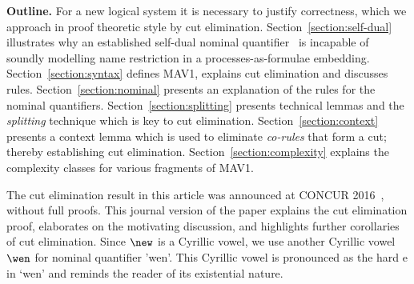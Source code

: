 \documentclass[UKenglish,acmsmall,authorversion]{acmart}
\theoremstyle{plain}
\begin{document}
\textbf{Outline.}
For a new logical system it is necessary to justify correctness, which we approach in proof theoretic style by cut elimination.
Section~\ref{section:self-dual} illustrates why an established self-dual nominal quantifier~\cite{Gabbay2002,Pitts2003,Tiu2009,Gacek2011} is incapable of soundly modelling name restriction in a processes-as-formulae embedding.
Section~\ref{section:syntax} defines \textsf{MAV1}, explains cut elimination and discusses rules.
Section~\ref{section:nominal} presents an explanation of the rules for the nominal quantifiers.
Section~\ref{section:splitting} presents technical lemmas and the \textit{splitting} technique which is key to cut elimination.
Section~\ref{section:context} presents a context lemma which is used to eliminate \textit{co-rules} that form a cut; thereby establishing cut elimination.
Section~\ref{section:complexity} explains the complexity classes for various fragments of \textsf{MAV1}.

The cut elimination result in this article was announced at CONCUR 2016~\cite{Horne2016}, without full proofs.
This journal version of the paper explains the cut elimination proof, elaborates on the motivating discussion, and highlights further corollaries of cut elimination.
Since $\new$ is a Cyrillic vowel, we use another Cyrillic vowel $\wen$ for nominal quantifier 'wen'. This Cyrillic vowel is pronounced as the hard e in `wen' and reminds the reader of its existential nature.
\end{document}

